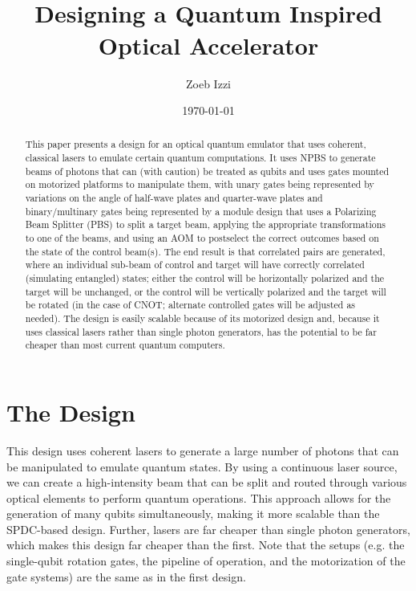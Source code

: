 \documentclass[12pt]{amsart}
\title[]{%
    \large{\textbf{}}\\[0.2em]
    \small {Designing a Quantum Inspired Optical Accelerator}%
}
\author{Zoeb Izzi}
\date{\today}
\begin{document}
    \begin{abstract}
        This paper presents a design for an optical quantum emulator that uses coherent, classical lasers to emulate certain quantum computations. It uses NPBS to generate beams of photons that can (with caution) be treated as qubits and uses gates mounted on motorized platforms to manipulate them, with unary gates being represented by variations on the angle of half-wave plates and quarter-wave plates and binary/multinary gates being represented by a module design that uses a Polarizing Beam Splitter (PBS) to split a target beam, applying the appropriate transformations to one of the beams, and using an AOM to postselect the correct outcomes based on the state of the control beam(s). The end result is that correlated pairs are generated, where an individual sub-beam of control and target will have correctly correlated (simulating entangled) states; either the control will be horizontally polarized and the target will be unchanged, or the control will be vertically polarized and the target will be rotated (in the case of CNOT; alternate controlled gates will be adjusted as needed). The design is easily scalable because of its motorized design and, because it uses classical lasers rather than single photon generators, has the potential to be far cheaper than most current quantum computers.  
    \end{abstract}
    \maketitle
    \newpage
    \tableofcontents
    \newpage


    \section{The Design}
    \label{sec:Design 2}
    This design uses coherent lasers to generate a large number of photons that can be manipulated to emulate quantum states. By using a continuous laser source, we can create a high-intensity beam that can be split and routed through various optical elements to perform quantum operations. This approach allows for the generation of many qubits simultaneously, making it more scalable than the SPDC-based design. Further, lasers are far cheaper than single photon generators, which makes this design far cheaper than the first. Note that the setups (e.g. the single-qubit rotation gates, the pipeline of operation, and the motorization of the gate systems) are the same as in the first design.
\end{document}
